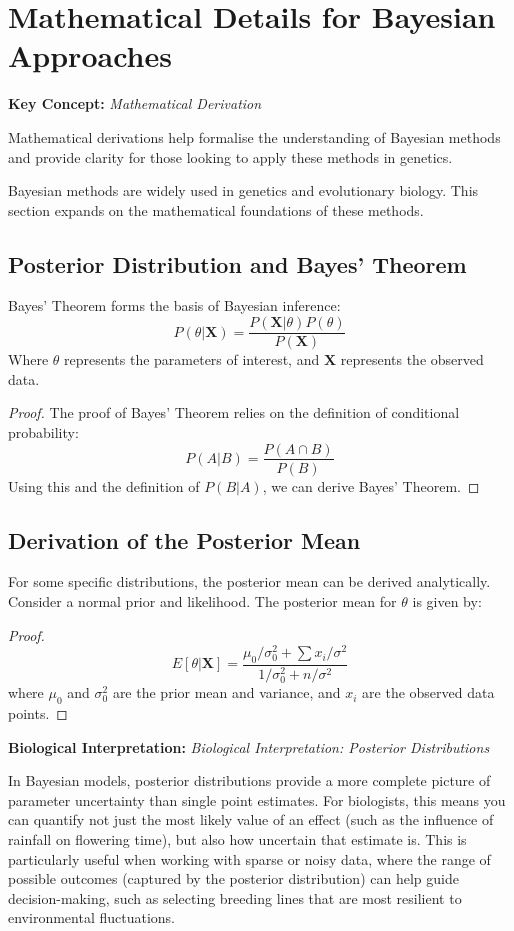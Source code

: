 \documentclass[12pt,a4paper]{article}
\newenvironment{keyconceptbox}[1][]
{\begin{basebox}[linecolor=uqblue]
\textbf{\color{uqblue}Key Concept:} \textit{#1}\par\noindent\ignorespaces}
{\end{basebox}}
\newenvironment{interpretation}[1][]
{\begin{basebox}[linecolor=uqgreen]
\textbf{\color{uqgreen}Biological Interpretation:} \textit{#1}\par\noindent\ignorespaces}
{\end{basebox}}
\begin{document}
\section{Mathematical Details for Bayesian Approaches}

\begin{keyconceptbox}[Mathematical Derivation]
Mathematical derivations help formalise the understanding of Bayesian methods and provide clarity for those looking to apply these methods in genetics.
\end{keyconceptbox}

Bayesian methods are widely used in genetics and evolutionary biology. This section expands on the mathematical foundations of these methods.

\subsection{Posterior Distribution and Bayes' Theorem}

Bayes' Theorem forms the basis of Bayesian inference:
\[
P(\theta | \mathbf{X}) = \frac{P(\mathbf{X} | \theta)P(\theta)}{P(\mathbf{X})}
\]
Where \( \theta \) represents the parameters of interest, and \( \mathbf{X} \) represents the observed data.

\begin{proof}
The proof of Bayes' Theorem relies on the definition of conditional probability:
\[
P(A | B) = \frac{P(A \cap B)}{P(B)}
\]
Using this and the definition of \( P(B | A) \), we can derive Bayes' Theorem.
\end{proof}

\subsection{Derivation of the Posterior Mean}

For some specific distributions, the posterior mean can be derived analytically. Consider a normal prior and likelihood. The posterior mean for \( \theta \) is given by:

\begin{proof}
\[
E[\theta | \mathbf{X}] = \frac{\mu_0/\sigma_0^2 + \sum x_i/\sigma^2}{1/\sigma_0^2 + n/\sigma^2}
\]
where \( \mu_0 \) and \( \sigma_0^2 \) are the prior mean and variance, and \( x_i \) are the observed data points.
\end{proof}

\begin{interpretation}[Biological Interpretation: Posterior Distributions]
In Bayesian models, posterior distributions provide a more complete picture of parameter uncertainty than single point estimates. For biologists, this means you can quantify not just the most likely value of an effect (such as the influence of rainfall on flowering time), but also how uncertain that estimate is. This is particularly useful when working with sparse or noisy data, where the range of possible outcomes (captured by the posterior distribution) can help guide decision-making, such as selecting breeding lines that are most resilient to environmental fluctuations.
\end{interpretation}
\end{document}
